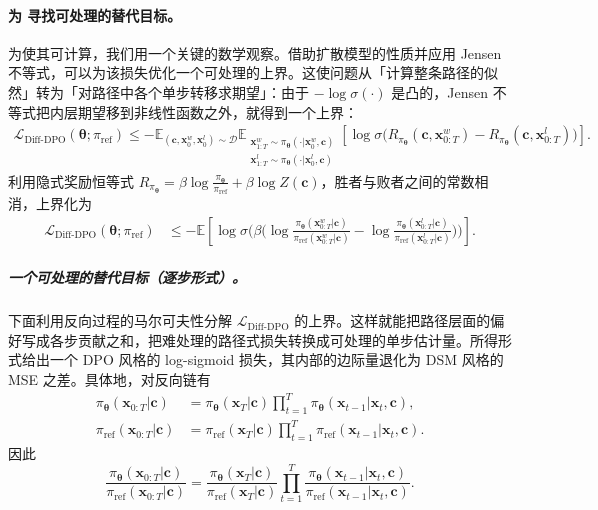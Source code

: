 \paragraph{为  寻找可处理的替代目标。}
为使其可计算，我们用一个关键的数学观察。借助扩散模型的性质并应用 Jensen 不等式，可以为该损失优化一个可处理的上界。这使问题从「计算整条路径的似然」转为「对路径中各个单步转移求期望」：由于 $-\log\sigma(\cdot)$ 是凸的，Jensen 不等式把内层期望移到非线性函数之外，就得到一个上界：
\begin{align*}
\mathcal L_{\mathrm{Diff\text{-}DPO}}(\bm\theta;\pi_{\mathrm{ref}})
\le
-\mathbb E_{(\mathbf c,\mathbf x_0^w,\mathbf x_0^l)\sim\mathcal D}
  \mathbb E_{\substack{\mathbf x^w_{1:T}\sim \pi_{\bm\theta}(\cdot | \mathbf x_0^w,\mathbf c)\\[1pt]
                       \mathbf x^l_{1:T}\sim \pi_{\bm\theta}(\cdot | \mathbf x_0^l,\mathbf c)}}
\left[
\log \sigma \Big(
R_{\pi_{\bm\theta}}(\mathbf c,\mathbf x^w_{0:T})
-
R_{\pi_{\bm\theta}}(\mathbf c,\mathbf x^l_{0:T})
\Big)
\right].
\end{align*}
利用隐式奖励恒等式 $R_{\pi_{\bm\theta}}=\beta\log\frac{\pi_{\bm\theta}}{\pi_{\mathrm{ref}}}+\beta\log Z(\mathbf c)$，胜者与败者之间的常数相消，上界化为
\begin{align}\label{eq:dpo-path-bound}
\mathcal L_{\mathrm{Diff\text{-}DPO}}(\bm\theta;\pi_{\mathrm{ref}})
& \le
-\mathbb E
\left[
\log \sigma \Big(
\beta\big(
\log\frac{\pi_{\bm\theta}(\mathbf x^w_{0:T}| \mathbf c)}{\pi_{\mathrm{ref}}(\mathbf x^w_{0:T}| \mathbf c)}
-
\log\frac{\pi_{\bm\theta}(\mathbf x^l_{0:T}| \mathbf c)}{\pi_{\mathrm{ref}}(\mathbf x^l_{0:T}| \mathbf c)}
\big)
\Big)
\right].
\end{align}\subparagraph{一个可处理的替代目标（逐步形式）。} 下面利用反向过程的马尔可夫性分解 $\mathcal L_{\mathrm{Diff\text{-}DPO}}$ 的上界。这样就能把路径层面的偏好写成各步贡献之和，把难处理的路径式损失转换成可处理的单步估计量。所得形式给出一个 DPO 风格的 log-sigmoid 损失，其内部的边际量退化为 DSM 风格的 MSE 之差。具体地，对反向链有
\begin{align*}
    \pi_{\bm\theta}(\mathbf x_{0:T}| \mathbf c)
&=\pi_{\bm\theta}(\mathbf x_T| \mathbf c) \prod_{t=1}^{T}
\pi_{\bm\theta}(\mathbf x_{t-1}| \mathbf x_t,\mathbf c),
\\
\pi_{\mathrm{ref}}(\mathbf x_{0:T}| \mathbf c)
&=\pi_{\mathrm{ref}}(\mathbf x_T| \mathbf c) \prod_{t=1}^{T}
\pi_{\mathrm{ref}}(\mathbf x_{t-1}| \mathbf x_t,\mathbf c).
\end{align*}
因此
\[
\frac{\pi_{\bm\theta}(\mathbf x_{0:T}| \mathbf c)}{\pi_{\mathrm{ref}}(\mathbf x_{0:T}| \mathbf c)}
=
\frac{\pi_{\bm\theta}(\mathbf x_T| \mathbf c)}{\pi_{\mathrm{ref}}(\mathbf x_T| \mathbf c)}
\prod_{t=1}^{T}
\frac{\pi_{\bm\theta}(\mathbf x_{t-1}| \mathbf x_t,\mathbf c)}
     {\pi_{\mathrm{ref}}(\mathbf x_{t-1}| \mathbf x_t,\mathbf c)}.
\]
